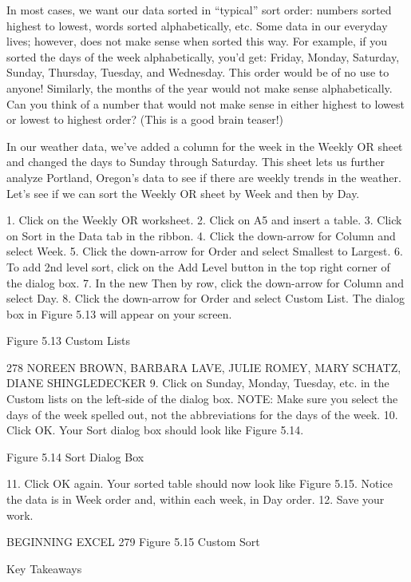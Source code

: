 In most cases, we want our data sorted in “typical” sort order: numbers sorted highest to lowest, words
sorted alphabetically, etc. Some data in our everyday lives; however, does not make sense when sorted
this way. For example, if you sorted the days of the week alphabetically, you’d get: Friday, Monday,
Saturday, Sunday, Thursday, Tuesday, and Wednesday. This order would be of no use to anyone!
Similarly, the months of the year would not make sense alphabetically. Can you think of a number
that would not make sense in either highest to lowest or lowest to highest order? (This is a good brain
teaser!)

In our weather data, we’ve added a column for the week in the Weekly OR sheet and changed the days
to Sunday through Saturday. This sheet lets us further analyze Portland, Oregon’s data to see if there
are weekly trends in the weather. Let’s see if we can sort the Weekly OR sheet by Week and then by
Day.

1.   Click on the Weekly OR worksheet.
2.   Click on A5 and insert a table.
3.   Click on Sort in the Data tab in the ribbon.
4.   Click the down-arrow for Column and select Week.
5.   Click the down-arrow for Order and select Smallest to Largest.
6.   To add 2nd level sort, click on the Add Level button in the top right corner of the dialog box.
7.   In the new Then by row, click the down-arrow for Column and select Day.
8.   Click the down-arrow for Order and select Custom List. The dialog box in Figure 5.13 will
appear on your screen.




Figure 5.13 Custom Lists


278 NOREEN BROWN, BARBARA LAVE, JULIE ROMEY, MARY SCHATZ, DIANE SHINGLEDECKER
9. Click on Sunday, Monday, Tuesday, etc. in the Custom lists on the left-side of the dialog box.
NOTE: Make sure you select the days of the week spelled out, not the abbreviations for the days
of the week.
10. Click OK. Your Sort dialog box should look like Figure 5.14.




Figure 5.14 Sort Dialog Box


11. Click OK again. Your sorted table should now look like Figure 5.15. Notice the data is in Week
order and, within each week, in Day order.
12. Save your work.




BEGINNING EXCEL 279
Figure 5.15 Custom Sort




Key Takeaways


